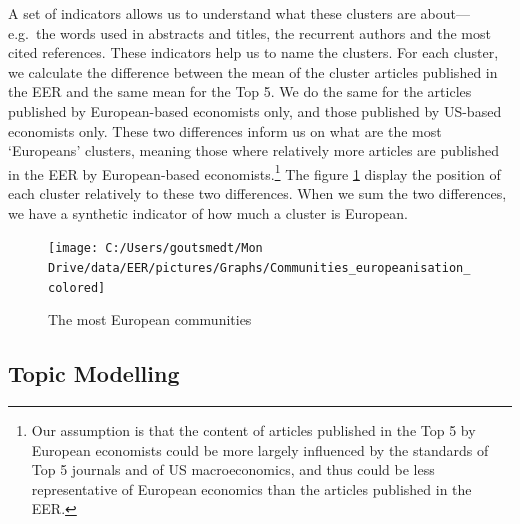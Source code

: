 \documentclass[]{elsarticle} %
\begin{document}
A set of indicators allows us to understand what these clusters are
about---e.g.~the words used in abstracts and titles, the recurrent
authors and the most cited references. These indicators help us to name
the clusters. For each cluster, we calculate the difference between the
mean of the cluster articles published in the EER and the same mean for
the Top 5. We do the same for the articles published by European-based
economists only, and those published by US-based economists only. These
two differences inform us on what are the most `Europeans' clusters,
meaning those where relatively more articles are published in the EER by
European-based economists.\footnote{Our assumption is that the content
  of articles published in the Top 5 by European economists could be
  more largely influenced by the standards of Top 5 journals and of US
  macroeconomics, and thus could be less representative of European
  economics than the articles published in the EER.} The figure
\ref{fig:plot-community-diff} display the position of each cluster
relatively to these two differences. When we sum the two differences, we
have a synthetic indicator of how much a cluster is European.

\begin{figure}[h]

{\centering \texttt{[image: C:/Users/goutsmedt/Mon Drive/data/EER/pictures/Graphs/Communities\_europeanisation\_colored]} 

}

\caption{The most European communities}\label{fig:plot-community-diff}
\end{figure}

\hypertarget{topic-modelling}{%
\subsection{Topic Modelling}\label{topic-modelling}}
\end{document}
